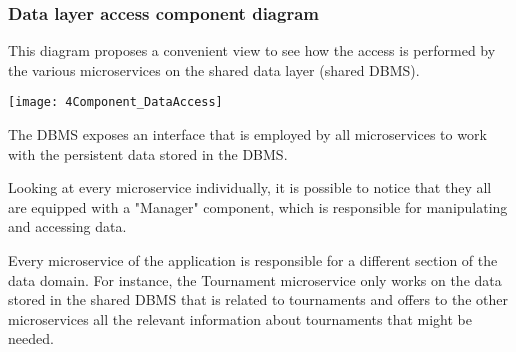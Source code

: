 \subsubsection{Data layer access component diagram}
\begin{minipage}{\linewidth}
	This diagram proposes a convenient view to see how the access is performed by the various microservices on the shared data layer (shared DBMS).
	
	\vspace{2cm}
	\texttt{[image: 4Component\_DataAccess]}
	
	\vspace{2cm}
	
	The DBMS exposes an interface that is employed by all microservices to work with the persistent data stored in the DBMS.
	
	Looking at every microservice individually, it is possible to notice that they all are equipped with a "Manager" component, which is responsible for manipulating and accessing data.
	
	Every microservice of the \app application is responsible for a different section of the data domain. For instance, the Tournament microservice only works on the data stored in the shared DBMS that is related to tournaments and offers to the other microservices all the relevant information about tournaments that might be needed.
	

\end{minipage}

